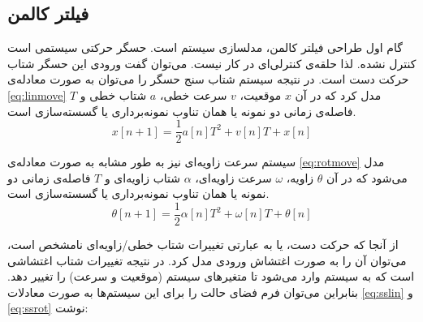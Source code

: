 \subsection{فیلتر کالمن}
گام اول طراحی فیلتر کالمن، مدلسازی سیستم است. حسگر حرکتی سیستمی است کنترل نشده. لذا حلقه‌ی کنترلی‌ای در کار نیست. می‌توان گفت ورودی این حسگر شتاب حرکت دست است. در نتیجه سیستم شتاب سنج حسگر را می‌توان به صورت معادله‌ی \ref{eq:linmove} مدل کرد که در آن $x$ موقعیت، $v$ سرعت خطی، $a$ شتاب خطی و $T$ فاصله‌ی زمانی دو نمونه یا همان تناوب نمونه‌برداری یا گسسته‌سازی است.
\begin{equation}
	x[n+1] = \frac{1}{2}a[n]T^2 + v[n]T + x[n] 
	\label{eq:linmove}
\end{equation}

سیستم سرعت زاویه‌ای نیز به طور مشابه به صورت معادله‌ی \ref{eq:rotmove} مدل می‌شود که در آن $\theta$ زاویه، $\omega$ سرعت زاویه‌ای، $\alpha$ شتاب زاویه‌ای و $T$ فاصله‌ی زمانی دو نمونه یا همان تناوب نمونه‌برداری یا گسسته‌سازی است.
\begin{equation}
	\theta[n+1] = \frac{1}{2}\alpha[n]T^2 + \omega[n]T + \theta[n] 
	\label{eq:rotmove}
\end{equation}

از آنجا که حرکت دست، یا به عبارتی تغییرات شتاب خطی/زاویه‌ای نامشخص است، می‌توان آن را به صورت اغتشاش ورودی مدل کرد. در نتیجه تغییرات شتاب اغتشاشی است که به سیستم وارد می‌شود تا متغیرهای سیستم (موقعیت و سرعت) را تغییر دهد. بنابراین می‌توان فرم فضای حالت را برای این سیستم‌ها به صورت معادلات \ref{eq:sslin} و \ref{eq:ssrot} نوشت:

